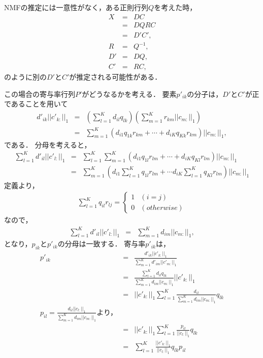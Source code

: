 NMFの推定には一意性がなく，ある正則行列$Q$を考えた時，
\begin{eqnarray}
	X &=& DC \\
	&=& D Q R C \\
	&=& D'C', \\
	R &=& Q^{-1}, \\
	D' &=& DQ, \\
	C' &=& RC,
\end{eqnarray}
のように別の$D'$と$C'$が推定される可能性がある．

この場合の寄与率行列$P'$がどうなるかを考える．
要素$p'_{ik}$の分子は，$D'$と$C'$が正であることを用いて
\begin{eqnarray}
	d'_{ik} ||c'_{k:}||_1 &=& \left( \sum_{l = 1}^K d_{il} q_{lk} \right) \left( \sum_{m = 1}^K r_{km} ||c_{m:}||_1 \right) \\
	&=& \sum_{m = 1}^K \left( d_{i1} q_{1k} r_{km} + \cdots + d_{iK} q_{Kk} r_{km} \right) ||c_{m:}||_1,
\end{eqnarray}
である．
分母を考えると，
\begin{eqnarray}
	\sum_{l=1}^K d'_{il}||c'_{l:} ||_1 &=& \sum_{l = 1}^K \sum_{m = 1}^K \left( d_{i1} q_{1l} r_{lm} + \cdots + d_{iK} q_{Kl} r_{lm} \right) ||c_{m:}||_1 \\
	&=& \sum_{m = 1}^K \left( d_{i1} \sum_{l = 1}^K q_{1l}r_{lm} + \cdots d_{iK} \sum_{l = 1}^K q_{Kl} r_{lm}\right) ||c_{m:}||_1
\end{eqnarray}
定義より，
\begin{eqnarray}
	\sum_{l = 1}^{K} q_{il} r_{lj} = \begin{cases}
    1 & (i = j) \\
    0 & (otherwise)
  \end{cases}
\end{eqnarray}
なので，
\begin{eqnarray}
	\sum_{l=1}^K d'_{il} || c'_{l:} ||_1 &=& \sum_{m = 1}^K d_{im} ||c_{m:}||_1,
\end{eqnarray}
となり，$p_{ik}$と$p'_{ik}$の分母は一致する．
寄与率$p'_{ik}$は，
\begin{eqnarray}
	p'_{ik} &=& \frac{ d'_{ik} || c'_{k:}||_1 }{ \sum_{m = 1}^K d'_{im} || c'_{m:}||_1 } \\
	&=& \frac{\sum_{l = 1}^K d_{il} q_{lk}}{\sum_{m=1}^K d_{im} || c_{m:} ||_1} ||c'_{k:}||_1 \\
	&=& ||c'_{k:}||_1 \sum_{l = 1}^K \frac{d_{il}}{\sum_{m=1}^K d_{im} || c_{m:} ||_1} q_{lk} \\
	p_{il} = \frac{d_{il} ||c_{l:}||_1 }{ \sum_{m = 1}^K d_{im} || c_{m:} ||_1 } \text{より，} \\
	&=& ||c'_{k:}||_1 \sum_{l = 1}^K \frac{p_{il}}{ ||c_{l:}||_1 } q_{lk}\\
	&=& \sum_{l = 1}^K \frac{ ||c'_{k:}||_1 }{ ||c_{l:}||_1 } q_{lk} p_{il}
\end{eqnarray}
